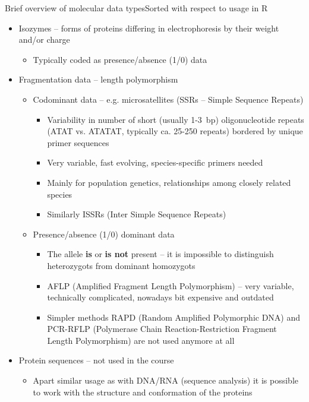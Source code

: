 \documentclass[compress, ucs, xelatex, 11pt, xcolor=svgnames,
  hyperref={
    bookmarks=true,
    unicode=true,
    colorlinks=true,
    pdftitle={Molecular data in R},
    plainpages=false,
    pdfauthor={Vojtech Zeisek},
    pdfsubject={Course about phylogeny and evolution in R},
    pdfcreator={XeLaTeX},
    pdfkeywords={R, evolution, phylogeny, molecular data},
    linkcolor=Tomato,
    anchorcolor=SaddleBrown,
    citecolor=Goldenrod,
    filecolor=DarkMagenta,
    menucolor=Sienna,
    urlcolor=DarkTurquoise,
    pdftex},
  url={hyphens, lowtilde} %
  ]{beamer}
\begin{document}
\begin{frame}[allowframebreaks]{Brief overview of molecular data types}{Sorted with respect to usage in R}
  \begin{itemize}
    \item Isozymes -- forms of proteins differing in electrophoresis by their weight and/or charge
    \begin{itemize}
      \item Typically coded as presence/absence (1/0) data
    \end{itemize}
    \item Fragmentation data -- length polymorphism
    \begin{itemize}
      \item Codominant data -- e.g. microsatellites (SSRs -- Simple Sequence Repeats)
      \begin{itemize}
	\item Variability in number of short (usually 1-3~bp) oligonucleotide repeats (ATAT vs. ATATAT, typically ca. 25-250 repeats) bordered by unique primer sequences
	\item Very variable, fast evolving, species-specific primers needed
	\item Mainly for population genetics, relationships among closely related species
	\item Similarly ISSRs (Inter Simple Sequence Repeats)
      \end{itemize}
      \item Presence/absence (1/0) dominant data
      \begin{itemize}
	\item The allele \textbf{is} or \textbf{is not} present  -- it is impossible to distinguish heterozygots from dominant homozygots
	\item AFLP (Amplified Fragment Length Polymorphism) -- very variable, technically complicated, nowadays bit expensive and outdated
	\item Simpler methods RAPD (Random Amplified Polymorphic DNA) and PCR-RFLP (Polymerase Chain Reaction-Restriction Fragment Length Polymorphism) are not used anymore at all
      \end{itemize}
    \end{itemize}
    \item Protein sequences -- not used in the course
    \begin{itemize}
      \item Apart similar usage as with DNA/RNA (sequence analysis) it is possible to work with the structure and conformation of the proteins

\end{itemize}
\end{itemize}
\end{frame}
\end{document}
